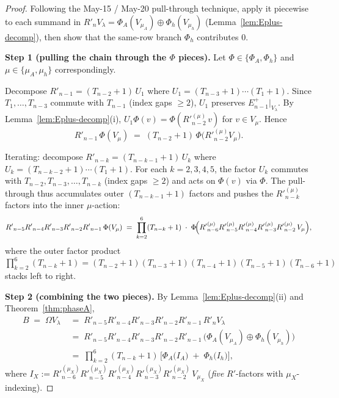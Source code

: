 \documentclass[11pt]{article}
\theoremstyle{definition}
\newcommand{\Om}{\Omega}
\newcommand{\Rp}{{R'}}
\begin{document}
\begin{proof}
Following the May-15 / May-20 pull-through technique, apply it
piecewise to each summand in
$\Rp_n V_\lambda = \Phi_A(V_{\mu_A}) \oplus \Phi_h(V_{\mu_h})$
(Lemma~\ref{lem:Eplus-decomp}), then show that the same-row branch
$\Phi_h$ contributes $0$.

\medskip\textbf{Step 1 (pulling the chain through the $\Phi$ pieces).}
Let $\Phi \in \{\Phi_A, \Phi_h\}$ and $\mu \in \{\mu_A, \mu_h\}$
correspondingly.

Decompose $\Rp_{n-1} = (T_{n-2}+1)\,U_1$ where
$U_1 = (T_{n-3}+1)\cdots(T_1+1)$.  Since $T_1, \ldots, T_{n-3}$ commute
with $T_{n-1}$ (index gaps $\ge 2$), $U_1$ preserves
$E_{n-1}^+|_{V_\lambda}$.  By Lemma~\ref{lem:Eplus-decomp}(i),
$U_1 \Phi(v) = \Phi(\Rp_{n-2}^{(\mu)}\,v)$ for $v \in V_\mu$.  Hence
\[
   \Rp_{n-1}\,\Phi(V_\mu) \;=\; (T_{n-2}+1)\,\Phi\bigl(\Rp_{n-2}^{(\mu)} V_\mu\bigr).
\]

Iterating: decompose $\Rp_{n-k} = (T_{n-k-1}+1)\,U_k$ where
$U_k = (T_{n-k-2}+1)\cdots(T_1+1)$.  For each $k = 2, 3, 4, 5$, the
factor $U_k$ commutes with $T_{n-2}, T_{n-3}, \ldots, T_{n-k}$
(index gaps $\ge 2$) and acts on $\Phi(v)$ via $\Phi$.  The pull-through
thus accumulates outer $(T_{n-k-1}+1)$ factors and pushes the
$\Rp^{(\mu)}_{n-k}$ factors into the inner $\mu$-action:
\begin{equation}\label{eq:branchpull}
   \Rp_{n-5}\Rp_{n-4}\Rp_{n-3}\Rp_{n-2}\Rp_{n-1}\,\Phi(V_\mu)
   \;=\;
   \prod_{k=2}^{6} (T_{n-k}+1)\;\cdot\;
   \Phi\!\Bigl(\Rp^{(\mu)}_{n-6} \Rp^{(\mu)}_{n-5} \Rp^{(\mu)}_{n-4}
                \Rp^{(\mu)}_{n-3} \Rp^{(\mu)}_{n-2}\,V_\mu\Bigr),
\end{equation}
where the outer factor product $\prod_{k=2}^{6}(T_{n-k}+1) =
(T_{n-2}+1)(T_{n-3}+1)(T_{n-4}+1)(T_{n-5}+1)(T_{n-6}+1)$ stacks left to right.

\medskip\textbf{Step 2 (combining the two pieces).}
By Lemma~\ref{lem:Eplus-decomp}(ii) and Theorem~\ref{thm:phaseA},
\begin{align*}
   B \;=\; \Om V_\lambda
   &\;=\; \Rp_{n-5}\Rp_{n-4}\Rp_{n-3}\Rp_{n-2}\Rp_{n-1}\,\Rp_n V_\lambda \\
   &\;=\; \Rp_{n-5}\Rp_{n-4}\Rp_{n-3}\Rp_{n-2}\Rp_{n-1}\,\bigl(\Phi_A(V_{\mu_A}) \oplus \Phi_h(V_{\mu_h})\bigr) \\
   &\;=\; \prod_{k=2}^6 (T_{n-k}{+}1)\,
        \bigl[\Phi_A\bigl(I_A\bigr) \;+\; \Phi_h\bigl(I_h\bigr)\bigr],
\end{align*}
where $I_X := \Rp^{(\mu_X)}_{n-6} \Rp^{(\mu_X)}_{n-5}\Rp^{(\mu_X)}_{n-4}
\Rp^{(\mu_X)}_{n-3}\Rp^{(\mu_X)}_{n-2}\,V_{\mu_X}$ (\emph{five}
$\Rp$-factors with $\mu_X$-indexing).


\end{proof}
\end{document}
